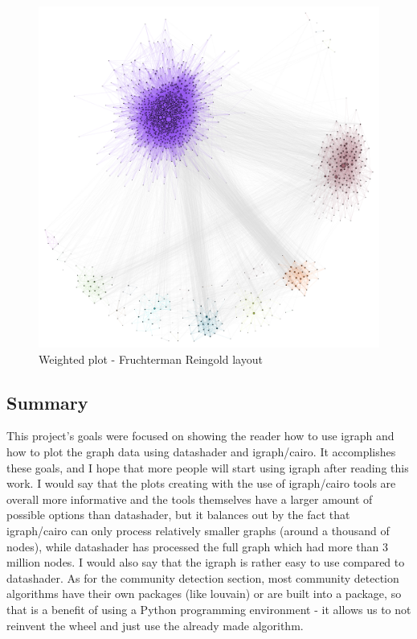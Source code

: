 \documentclass[12pt, a4paper]{article}
\begin{document}
\begin{figure}
    \centering
    \includegraphics[width=\textwidth]{src/youtube/hdg_weighted/hdg_pg_fg}
    \caption{Weighted plot - Fruchterman Reingold layout}
    \label{fig:hdg_pg_fg}
\end{figure}

\subsection{Summary}

This project's goals were focused on showing the reader how to use igraph and how to plot the graph data using datashader and igraph/cairo. It accomplishes these goals, and I hope that more people will start using igraph after reading this work.
I would say that the plots creating with the use of igraph/cairo tools are overall more informative and the tools themselves have a larger amount of possible options than datashader, but it balances out by the fact that igraph/cairo can only process relatively smaller graphs (around a thousand of nodes), while datashader has processed the full graph which had more than 3 million nodes. I would also say that the igraph is rather easy to use compared to datashader.
As for the community detection section, most community detection algorithms have their own packages (like louvain) or are built into a package, so that is a benefit of using a Python programming environment - it allows us to not reinvent the wheel and just use the already made algorithm.
\end{document}
